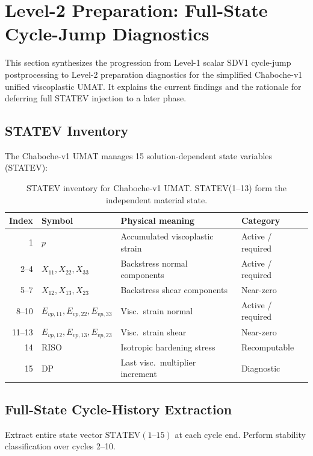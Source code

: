 \section{Level-2 Preparation: Full-State Cycle-Jump Diagnostics}

This section synthesizes the progression from Level-1 scalar SDV1 cycle-jump postprocessing to Level-2 preparation diagnostics for the simplified Chaboche-v1 unified viscoplastic UMAT. It explains the current findings and the rationale for deferring full STATEV injection to a later phase.

\subsection{STATEV Inventory}

The Chaboche-v1 UMAT manages 15 solution-dependent state variables (STATEV):

\begin{table}[ht]
\centering
\small
\begin{tabular}{r|l|l|l}
\toprule
\textbf{Index} & \textbf{Symbol} & \textbf{Physical meaning} & \textbf{Category} \\
\midrule
1  & $p$ & Accumulated viscoplastic strain & Active / required \\
2--4 & $X_{11}, X_{22}, X_{33}$ & Backstress normal components & Active / required \\
5--7 & $X_{12}, X_{13}, X_{23}$ & Backstress shear components & Near-zero \\
8--10 & $E_{vp,11}, E_{vp,22}, E_{vp,33}$ & Visc.~strain normal & Active / required \\
11--13 & $E_{vp,12}, E_{vp,13}, E_{vp,23}$ & Visc.~strain shear & Near-zero \\
14 & RISO & Isotropic hardening stress & Recomputable \\
15 & DP & Last visc.~multiplier increment & Diagnostic \\
\bottomrule
\end{tabular}
\caption{STATEV inventory for Chaboche-v1 UMAT. STATEV(1--13) form the independent material state.}
\end{table}

\subsection{Full-State Cycle-History Extraction}

Extract entire state vector $\text{STATEV}(1\text{--}15)$ at each cycle end. Perform stability classification over cycles 2--10.

